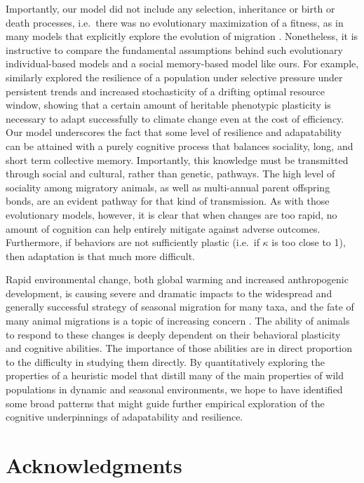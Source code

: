 \documentclass[12pt]{article}
\begin{document}
Importantly, our model did not include any selection, inheritance or birth or death processes, i.e.~there was no evolutionary maximization of a fitness, as in many models that explicitly explore the evolution of migration \citep[e.g.][]{Guttal2010, Shaw2013, Anderson2013}. Nonetheless, it is instructive to compare the fundamental assumptions behind such evolutionary individual-based models and a social memory-based model like ours. For example, \citet{Anderson2013} similarly explored the resilience of a population under selective pressure under persistent trends and increased stochasticity of a drifting optimal resource window, showing that a certain amount of heritable phenotypic plasticity is necessary to adapt successfully to climate change even at the cost of efficiency. Our model underscores the fact that some level of resilience and adapatability can be attained with a purely cognitive process that balances sociality, long, and short term collective memory. Importantly, this knowledge must be transmitted through social and cultural, rather than genetic, pathways. The high level of sociality among migratory animals, as well as multi-annual parent offspring bonds, are an evident pathway for that kind of transmission. As with those evolutionary models, however, it is clear that when changes are too rapid, no amount of cognition can help
entirely mitigate against adverse outcomes. Furthermore, if behaviors are not sufficiently plastic (i.e.~if $\kappa$ is too close to 1), then adaptation is that much more difficult.

Rapid environmental change, both global warming and increased anthropogenic development, is causing severe and dramatic impacts to the widespread and generally successful strategy of seasonal migration for many taxa, and the fate of many animal migrations is a topic of increasing concern \citep{Kauffman2021, Wilcove2008}. The ability of animals to respond to these changes is deeply dependent on their behavioral plasticity and cognitive abilities. The importance of those abilities are in direct proportion to the difficulty in studying them directly. By quantitatively exploring the properties of a heuristic model that distill many of the main properties of wild populations in dynamic and seasonal environments, we hope to have identified some broad patterns that might guide further empirical exploration of the cognitive underpinnings of adapatability and resilience.


\section{Acknowledgments}
\end{document}
